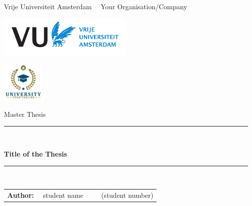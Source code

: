 \documentclass[openany,11pt]{Latex/classes/PhDthesisPSnPDF}
\begin{document}
	
	
	
	\frontmatter %
	
	\thispagestyle{empty} %
	
	\begin{center}
		
		Vrije Universiteit Amsterdam \hspace*{2cm} ~~Your Organisation/Company
		
		\vspace{1mm}
		
		\hspace*{-6.5cm}\includegraphics[height=20mm]{frontmatter/figures/vu-griffioen.pdf}
		
		\vspace*{-2cm}\hspace*{7.5cm}\includegraphics[height=20mm]{frontmatter/figures/your_logo.jpg}
		
		\vspace{2cm}
	
		{\Large Master Thesis}
		
		\vspace*{1.5cm}
		
		\rule{.9\linewidth}{.6pt}\\[0.4cm]
		{\huge \bfseries Title of the Thesis\par}\vspace{0.4cm}
		\rule{.9\linewidth}{.6pt}\\[1.5cm]
		
		\vspace*{2mm}
		
		{\Large
			\begin{tabular}{l}
				{\bf Author:} ~~student name ~~~~ (student number)
			\end{tabular}
		}
		

\end{center}
\end{document}

